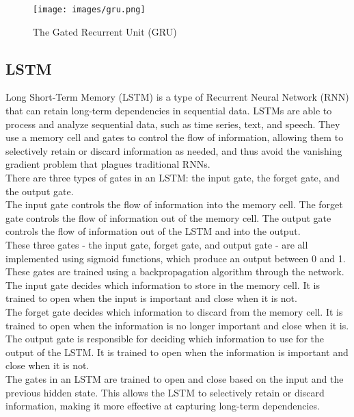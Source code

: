 \documentclass{ieeeojies}
\begin{document}
\begin{figure}[H]
    \centering
    \begin{minipage}{0.3\textwidth}
    \centering
    \texttt{[image: images/gru.png]}
    \caption{The Gated Recurrent Unit (GRU)}
    \label{fig:1}
    \end{minipage}
\end{figure}

\subsection{LSTM}
\indent Long Short-Term Memory (LSTM) \cite{b16} is a type of Recurrent Neural Network (RNN) that can retain long-term dependencies in sequential data. LSTMs are able to process and analyze sequential data, such as time series, text, and speech. They use a memory cell and gates to control the flow of information, allowing them to selectively retain or discard information as needed, and thus avoid the vanishing gradient problem that plagues traditional RNNs.
\\
\indent There are three types of gates in an LSTM: the input gate, the forget gate, and the output gate.
\\
\indent The input gate controls the flow of information into the memory cell. The forget gate controls the flow of information out of the memory cell. The output gate controls the flow of information out of the LSTM and into the output.
\\
\indent These three gates - the input gate, forget gate, and output gate - are all implemented using sigmoid functions, which produce an output between 0 and 1. These gates are trained using a backpropagation algorithm through the network.
\\
\indent The input gate decides which information to store in the memory cell. It is trained to open when the input is important and close when it is not.
\\
\indent The forget gate decides which information to discard from the memory cell. It is trained to open when the information is no longer important and close when it is.
\\
\indent The output gate is responsible for deciding which information to use for the output of the LSTM. It is trained to open when the information is important and close when it is not.
\\
\indent The gates in an LSTM are trained to open and close based on the input and the previous hidden state. This allows the LSTM to selectively retain or discard information, making it more effective at capturing long-term dependencies.
\end{document}
